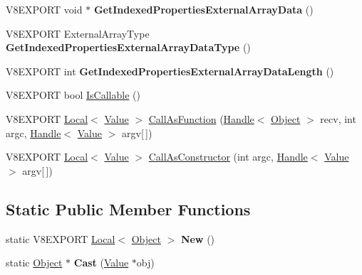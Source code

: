\begin{DoxyCompactItemize}
\item 
\hypertarget{classv8_1_1_object_a4ac77257bc3f809d4abc76f176909747}{}V8\+E\+X\+P\+O\+R\+T void $\ast$ {\bfseries Get\+Indexed\+Properties\+External\+Array\+Data} ()\label{classv8_1_1_object_a4ac77257bc3f809d4abc76f176909747}

\item 
\hypertarget{classv8_1_1_object_a235b6394b7651077dc2a7642bc97c4a9}{}V8\+E\+X\+P\+O\+R\+T External\+Array\+Type {\bfseries Get\+Indexed\+Properties\+External\+Array\+Data\+Type} ()\label{classv8_1_1_object_a235b6394b7651077dc2a7642bc97c4a9}

\item 
\hypertarget{classv8_1_1_object_aa0b083e6d5ec0a17d300759de482a1d2}{}V8\+E\+X\+P\+O\+R\+T int {\bfseries Get\+Indexed\+Properties\+External\+Array\+Data\+Length} ()\label{classv8_1_1_object_aa0b083e6d5ec0a17d300759de482a1d2}

\item 
V8\+E\+X\+P\+O\+R\+T bool \hyperlink{classv8_1_1_object_a73e7f8c470da4fa3ccc2ce8d58671bed}{Is\+Callable} ()
\item 
V8\+E\+X\+P\+O\+R\+T \hyperlink{classv8_1_1_local}{Local}$<$ \hyperlink{classv8_1_1_value}{Value} $>$ \hyperlink{classv8_1_1_object_ab6b6c44668d7a0d0b5b1056f8de4fd6b}{Call\+As\+Function} (\hyperlink{classv8_1_1_handle}{Handle}$<$ \hyperlink{classv8_1_1_object}{Object} $>$ recv, int argc, \hyperlink{classv8_1_1_handle}{Handle}$<$ \hyperlink{classv8_1_1_value}{Value} $>$ argv\mbox{[}$\,$\mbox{]})
\item 
V8\+E\+X\+P\+O\+R\+T \hyperlink{classv8_1_1_local}{Local}$<$ \hyperlink{classv8_1_1_value}{Value} $>$ \hyperlink{classv8_1_1_object_a156c6b33082be397626ce106369e4eba}{Call\+As\+Constructor} (int argc, \hyperlink{classv8_1_1_handle}{Handle}$<$ \hyperlink{classv8_1_1_value}{Value} $>$ argv\mbox{[}$\,$\mbox{]})
\end{DoxyCompactItemize}
\subsection*{Static Public Member Functions}
\begin{DoxyCompactItemize}
\item 
\hypertarget{classv8_1_1_object_a45c986af65c199e7f453719d03de7650}{}static V8\+E\+X\+P\+O\+R\+T \hyperlink{classv8_1_1_local}{Local}$<$ \hyperlink{classv8_1_1_object}{Object} $>$ {\bfseries New} ()\label{classv8_1_1_object_a45c986af65c199e7f453719d03de7650}

\item 
\hypertarget{classv8_1_1_object_a1f9ac46d0b164197318ce81dc0ec1343}{}static \hyperlink{classv8_1_1_object}{Object} $\ast$ {\bfseries Cast} (\hyperlink{classv8_1_1_value}{Value} $\ast$obj)\label{classv8_1_1_object_a1f9ac46d0b164197318ce81dc0ec1343}

\end{DoxyCompactItemize}


